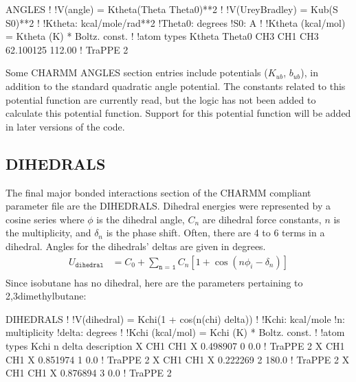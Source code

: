 \documentclass[letterpaper,10pt,english]{sphinxmanual}
\begin{document}
\begin{sphinxVerbatim}[commandchars=\\\{\}]
ANGLES
!
!V(angle) = Ktheta(Theta \PYGZhy{} Theta0)**2
!
!V(Urey\PYGZhy{}Bradley) = Kub(S \PYGZhy{} S0)**2
!
!Ktheta:  kcal/mole/rad**2
!Theta0:  degrees
!S0:  A
!
!Ktheta (kcal/mol) = Ktheta (K) * Boltz.  const.
!
!atom types         Ktheta        Theta0
CH3   CH1   CH3     62.100125     112.00 !  TraPPE 2
\end{sphinxVerbatim}

\sphinxAtStartPar
Some CHARMM ANGLES section entries include  potentials (\(K_{ub}\), \(b_{ub}\)), in addition to the standard quadratic angle potential. The constants related to this potential function are currently read, but the logic has not been added to calculate this potential function. Support for this potential function will be added in later versions of the code.


\subsection{DIHEDRALS}
\label{\detokenize{input_file:dihedrals}}
\sphinxAtStartPar
The final major bonded interactions section of the CHARMM compliant parameter file are the DIHEDRALS. Dihedral energies were represented by a cosine series where \(\phi\) is the dihedral angle, \(C_n\) are dihedral force constants, \(n\) is the multiplicity, and \(\delta_n\) is the phase shift.
Often, there are 4 to 6 terms in a dihedral. Angles for the dihedrals’ deltas are given in degrees.
\begin{equation*}
\begin{split}U_{\texttt{dihedral}}&= C_0 + \sum_{\texttt{n = 1}} C_n [1+\cos(n\phi_i - \delta_n)]\\\end{split}
\end{equation*}
\sphinxAtStartPar
Since isobutane has no dihedral, here are the parameters pertaining to 2,3\sphinxhyphen{}dimethylbutane:

\begin{sphinxVerbatim}[commandchars=\\\{\}]
DIHEDRALS
!
!V(dihedral) = Kchi(1 + cos(n(chi) \PYGZhy{} delta))
!
!Kchi:  kcal/mole
!n:  multiplicity
!delta:  degrees
!
!Kchi (kcal/mol) = Kchi (K) * Boltz.  const.
!
!atom types             Kchi    n     delta   description
X   CH1   CH1   X    \PYGZhy{}0.498907  0     0.0   !  TraPPE 2
X   CH1   CH1   X     0.851974  1     0.0   !  TraPPE 2
X   CH1   CH1   X    \PYGZhy{}0.222269  2   180.0   !  TraPPE 2
X   CH1   CH1   X     0.876894  3     0.0   !  TraPPE 2
\end{sphinxVerbatim}
\end{document}
